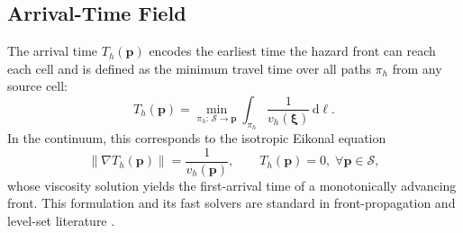\documentclass[preprint,12pt]{elsarticle}
\providecommand{\FloatBarrier}{}
\let\origsubsection\subsection
\renewcommand{\subsection}{\FloatBarrier\origsubsection}
\let\origsubsubsection\subsubsection
\renewcommand{\subsubsection}{\FloatBarrier\origsubsubsection}
\begin{document}




\subsection{Arrival-Time Field}
\label{sec:hazard_arrival_time}

The arrival time $T_h(\mathbf{p})$ encodes the earliest time the hazard front
can reach each cell and is defined as the minimum travel time over all paths
$\pi_h$ from any source cell:
\begin{equation}
T_h(\mathbf{p}) = \min_{\pi_h:\,\mathcal{S} \rightarrow \mathbf{p}}
\int_{\pi_h} \frac{1}{v_h(\boldsymbol{\xi})} \, \mathrm{d}\ell.
\label{eq:traveltime}
\end{equation}
In the continuum, this corresponds to the isotropic Eikonal equation
\begin{equation}
\|\nabla T_h(\mathbf{p})\| = \frac{1}{v_h(\mathbf{p})},
\qquad T_h(\mathbf{p}) = 0, \; \forall \mathbf{p} \in \mathcal{S},
\label{eq:eikonal}
\end{equation}
whose viscosity solution yields the first-arrival time of a monotonically
advancing front. This formulation and its fast solvers are standard in
front-propagation and level-set literature
\citep{Sethian1996FastMarching,Zhao2005FastSweeping}.
\end{document}

